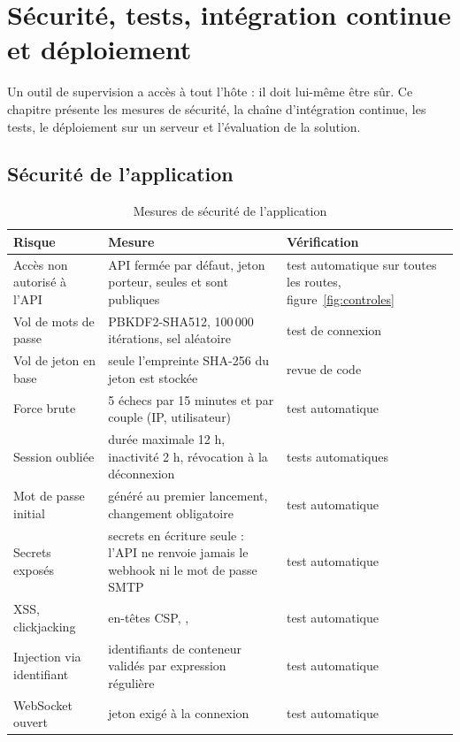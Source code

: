 \chapter{Sécurité, tests, intégration continue et déploiement}
\label{chap:devsecops}

\begin{introchapitre}
Un outil de supervision a accès à tout l'hôte : il doit lui-même être sûr. Ce chapitre présente
les mesures de sécurité, la chaîne d'intégration continue, les tests, le déploiement sur un
serveur et l'évaluation de la solution.
\end{introchapitre}

\section{Sécurité de l'application}

\begin{table}[htbp]
\centering
\small
\begin{tabularx}{\linewidth}{L{3.3cm}L{5.2cm}Y}
\toprule
\textbf{Risque} & \textbf{Mesure} & \textbf{Vérification} \\
\midrule
Accès non autorisé à l'API & API fermée par défaut, jeton porteur, seules  et  sont publiques & test automatique sur toutes les routes, figure~\ref{fig:controles} \\
Vol de mots de passe & PBKDF2-SHA512, 100\,000 itérations, sel aléatoire \cite{rfc8018} & test de connexion \\
Vol de jeton en base & seule l'empreinte SHA-256 du jeton est stockée & revue de code \\
Force brute & 5 échecs par 15 minutes et par couple (IP, utilisateur) & test automatique \\
Session oubliée & durée maximale 12 h, inactivité 2 h, révocation à la déconnexion & tests automatiques \\
Mot de passe initial & généré au premier lancement, changement obligatoire & test automatique \\
Secrets exposés & secrets en écriture seule : l'API ne renvoie jamais le webhook ni le mot de passe SMTP & test automatique \\
XSS, clickjacking & en-têtes CSP, ,  \cite{owasp} & test automatique \\
Injection via identifiant & identifiants de conteneur validés par expression régulière & test automatique \\
WebSocket ouvert & jeton exigé à la connexion & test automatique \\
\bottomrule
\end{tabularx}
\caption{Mesures de sécurité de l'application}
\label{tab:securite-app}
\end{table}

